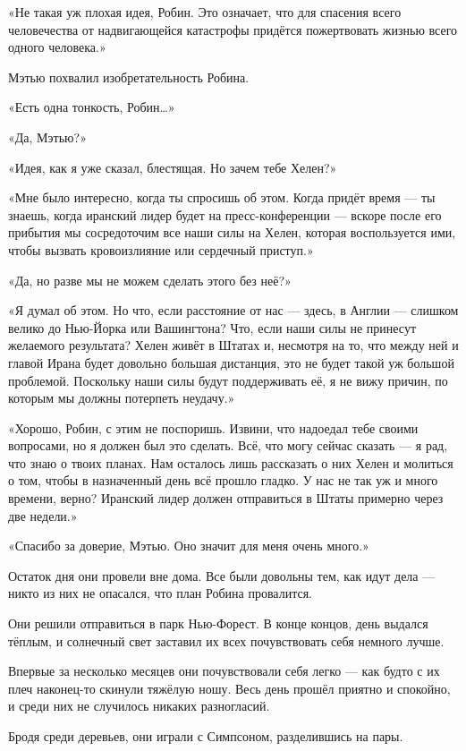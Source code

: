 \documentclass[a5paper, 9pt,
final, openany, twoside=true]{memoir}
\begin{document}
«Не такая уж плохая идея, Робин. Это означает, что для спасения всего человечества от надвигающейся катастрофы придётся пожертвовать жизнью всего одного человека.»

Мэтью похвалил изобретательность Робина.

«Есть одна тонкость, Робин…»

«Да, Мэтью?»

«Идея, как я уже сказал, блестящая. Но зачем тебе Хелен?»

«Мне было интересно, когда ты спросишь об этом. Когда придёт время — ты знаешь, когда иранский лидер будет на пресс-конференции — вскоре после его прибытия мы сосредоточим все наши силы на Хелен, которая воспользуется ими, чтобы вызвать кровоизлияние или сердечный приступ.»

«Да, но разве мы не можем сделать этого без неё?»

«Я думал об этом. Но что, если расстояние от нас — здесь, в Англии — слишком велико до Нью-Йорка или Вашингтона? Что, если наши силы не принесут желаемого результата? Хелен живёт в Штатах и, несмотря на то, что между ней и главой Ирана будет довольно большая дистанция, это не будет такой уж большой проблемой. Поскольку наши силы будут поддерживать её, я не вижу причин, по которым мы должны потерпеть неудачу.»

«Хорошо, Робин, с этим не поспоришь. Извини, что надоедал тебе своими вопросами, но я должен был это сделать. Всё, что могу сейчас сказать — я рад, что знаю о твоих планах. Нам осталось лишь рассказать о них Хелен и молиться о том, чтобы в назначенный день всё прошло гладко. У нас не так уж и много времени, верно? Иранский лидер должен отправиться в Штаты примерно через две недели.»

«Спасибо за доверие, Мэтью. Оно значит для меня очень много.»\bigskip

Остаток дня они провели вне дома. Все были довольны тем, как идут дела — никто из них не опасался, что план Робина провалится.

Они решили отправиться в парк Нью-Форест. В конце концов, день выдался тёплым, и солнечный свет заставил их всех почувствовать себя немного лучше.

Впервые за несколько месяцев они почувствовали себя легко — как будто с их плеч наконец-то скинули тяжёлую ношу. Весь день прошёл приятно и спокойно, и среди них не случилось никаких разногласий.

Бродя среди деревьев, они играли с Симпсоном, разделившись на пары.
\end{document}
